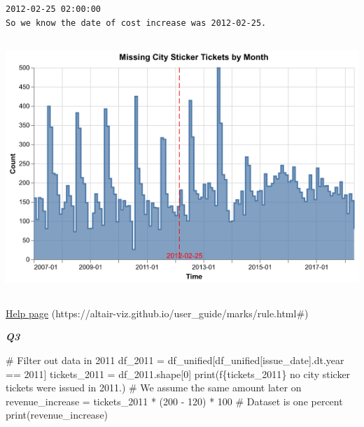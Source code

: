 \documentclass[
  letterpaper,
  DIV=11,
  numbers=noendperiod]{scrartcl}
\newenvironment{Shaded}{\begin{snugshade}}{\end{snugshade}}
\newcommand{\BuiltInTok}[1]{\textcolor[rgb]{0.00,0.23,0.31}{#1}}
\newcommand{\CommentTok}[1]{\textcolor[rgb]{0.37,0.37,0.37}{#1}}
\newcommand{\DecValTok}[1]{\textcolor[rgb]{0.68,0.00,0.00}{#1}}
\newcommand{\NormalTok}[1]{\textcolor[rgb]{0.00,0.23,0.31}{#1}}
\newcommand{\OperatorTok}[1]{\textcolor[rgb]{0.37,0.37,0.37}{#1}}
\newcommand{\SpecialCharTok}[1]{\textcolor[rgb]{0.37,0.37,0.37}{#1}}
\newcommand{\SpecialStringTok}[1]{\textcolor[rgb]{0.13,0.47,0.30}{#1}}
\newcommand{\StringTok}[1]{\textcolor[rgb]{0.13,0.47,0.30}{#1}}
\begin{document}
\begin{verbatim}
2012-02-25 02:00:00
So we know the date of cost increase was 2012-02-25.
\end{verbatim}

\includegraphics[width=5.73958in,height=3.79167in]{PS2 Answer_files/figure-pdf/cell-8-output-2.png}

\href{https://altair-viz.github.io/user_guide/marks/rule.html\#}{Help
page} (https://altair-viz.github.io/user\_guide/marks/rule.html\#)

\textbf{\emph{Q3}}

\begin{Shaded}
\begin{Highlighting}[]
\CommentTok{\# Filter out data in 2011}
\NormalTok{df\_2011 }\OperatorTok{=}\NormalTok{ df\_unified[df\_unified[}\StringTok{\textquotesingle{}issue\_date\textquotesingle{}}\NormalTok{].dt.year }\OperatorTok{==} \DecValTok{2011}\NormalTok{]}
\NormalTok{tickets\_2011 }\OperatorTok{=}\NormalTok{ df\_2011.shape[}\DecValTok{0}\NormalTok{]}
\BuiltInTok{print}\NormalTok{(}\SpecialStringTok{f\textquotesingle{}}\SpecialCharTok{\{}\NormalTok{tickets\_2011}\SpecialCharTok{\}}\SpecialStringTok{ no city sticker tickets were issued in 2011.\textquotesingle{}}\NormalTok{)}
\CommentTok{\# We assume the same amount later on}
\NormalTok{revenue\_increase }\OperatorTok{=}\NormalTok{ tickets\_2011 }\OperatorTok{*}\NormalTok{ (}\DecValTok{200} \OperatorTok{{-}} \DecValTok{120}\NormalTok{) }\OperatorTok{*} \DecValTok{100} \CommentTok{\# Dataset is one percent}
\BuiltInTok{print}\NormalTok{(revenue\_increase)}
\end{Highlighting}
\end{Shaded}
\end{document}
